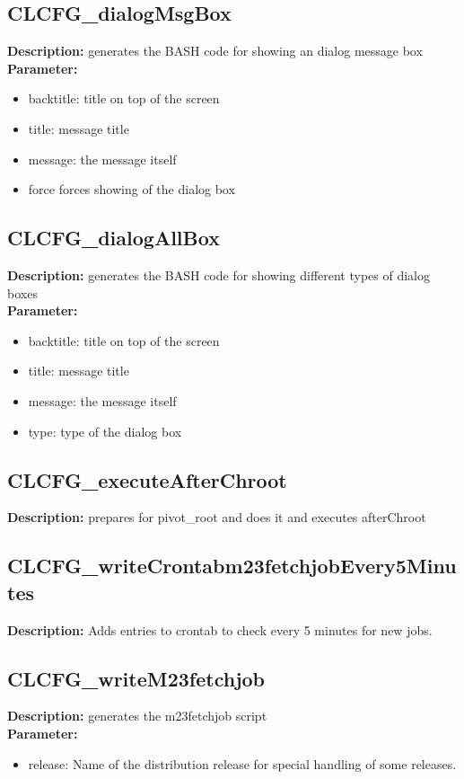 \subsection{CLCFG\_dialogMsgBox}
\textbf{Description:} generates the BASH code for showing an dialog message box\\
\textbf{Parameter:}
\begin{itemize}
\item backtitle: title on top of the screen
\item title: message title
\item message: the message itself
\item force forces showing of the dialog box
\end{itemize}

\subsection{CLCFG\_dialogAllBox}
\textbf{Description:} generates the BASH code for showing different types of dialog boxes\\
\textbf{Parameter:}
\begin{itemize}
\item backtitle: title on top of the screen
\item title: message title
\item message: the message itself
\item type: type of the dialog box
\end{itemize}

\subsection{CLCFG\_executeAfterChroot}
\textbf{Description:} prepares for pivot\_root and does it and executes afterChroot\\

\subsection{CLCFG\_writeCrontabm23fetchjobEvery5Minutes}
\textbf{Description:} Adds entries to crontab to check every 5 minutes for new jobs.\\

\subsection{CLCFG\_writeM23fetchjob}
\textbf{Description:} generates the m23fetchjob script\\
\textbf{Parameter:}
\begin{itemize}
\item release: Name of the distribution release for special handling of some releases.
\end{itemize}


